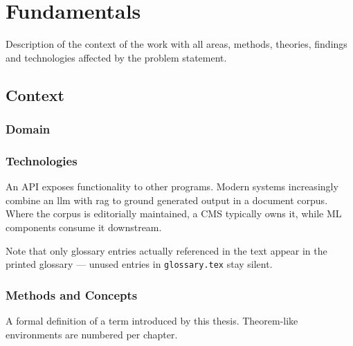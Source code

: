 \chapter{Fundamentals}
\label{ch:fundamentals}

Description of the context of the work with all areas, methods, theories,
findings and technologies affected by the problem statement.

\section{Context}
\label{sec:context}

\subsection{Domain}

\subsection{Technologies}

An \gls{API} exposes functionality to other programs. Modern systems
increasingly combine an \acrfull{llm} with \acrshort{rag} to ground generated
output in a document corpus. Where the corpus is editorially maintained, a
\gls{CMS} typically owns it, while \gls{ML} components consume it downstream.

Note that only glossary entries actually referenced in the text appear in the
printed glossary --- unused entries in \texttt{glossary.tex} stay silent.

\subsection{Methods and Concepts}

\begin{definition}
\label{def:example}
A formal definition of a term introduced by this thesis. Theorem-like
environments are numbered per chapter.
\end{definition}
